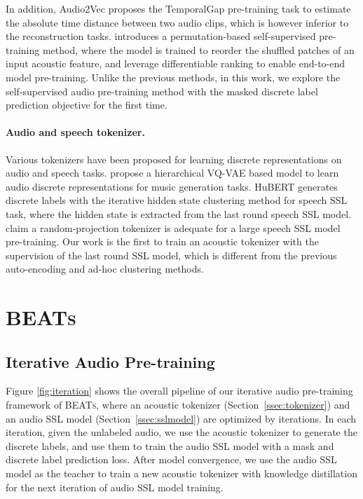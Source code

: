 \documentclass{article}
\theoremstyle{plain}
\theoremstyle{definition}
\theoremstyle{remark}
\newcommand\our{\textsc{BEATs}}
\begin{document}
In addition, Audio2Vec \citep{tagliasacchi2020pre} proposes the TemporalGap pre-training task to estimate the absolute time distance between two audio clips, which is however inferior to the reconstruction tasks.
\citet{carr2021self} introduces a permutation-based self-supervised pre-training method, where the model is trained to reorder the shuffled patches of an input acoustic feature, and leverage differentiable ranking to enable end-to-end model pre-training.
Unlike the previous methods, in this work, we explore the self-supervised audio pre-training method with the masked discrete label prediction objective for the first time.

\paragraph{Audio and speech tokenizer.} 
Various tokenizers have been proposed for learning discrete representations on audio and speech tasks. 
\cite{dieleman2018challenge} propose a hierarchical VQ-VAE based model to learn audio discrete representations for music generation tasks. 
HuBERT \citep{hsu2021hubert} generates discrete labels with the iterative hidden state clustering method for speech SSL task, where the hidden state is extracted from the last round speech SSL model.
\cite{chiu2022self} claim a random-projection tokenizer is adequate for a large speech SSL model pre-training.
Our work is the first to train an acoustic tokenizer with the supervision of the last round SSL model,  which is different from the previous auto-encoding and ad-hoc clustering methods.  

\section{\our{}}

\subsection{Iterative Audio Pre-training}

Figure \ref{fig:iteration} shows the overall pipeline of our iterative audio pre-training framework of \our{}, where an acoustic tokenizer (Section~\ref{ssec:tokenizer}) and an audio SSL model (Section~\ref{ssec:sslmodel}) are optimized by iterations.
In each iteration, given the unlabeled audio, we use the acoustic tokenizer to generate the discrete labels, and use them to train the audio SSL model with a mask and discrete label prediction loss.
After model convergence, we use the audio SSL model as the teacher to train a new acoustic tokenizer with knowledge distillation for the next iteration of audio SSL model training.
\end{document}
